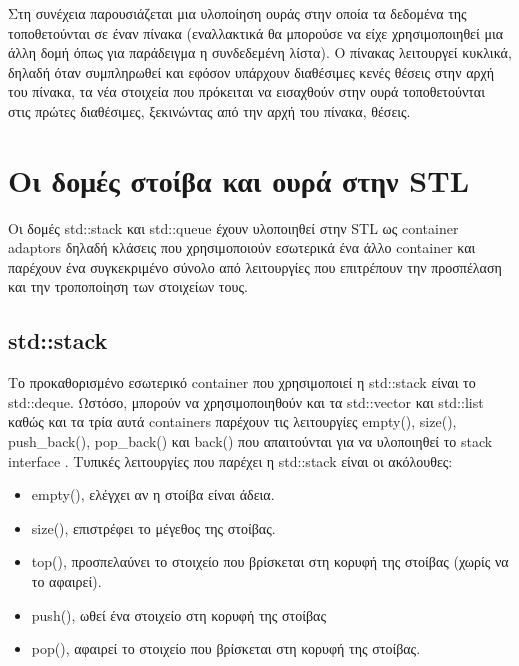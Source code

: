 Στη συνέχεια παρουσιάζεται μια υλοποίηση ουράς στην οποία τα δεδομένα της τοποθετούνται σε έναν πίνακα (εναλλακτικά θα μπορούσε να είχε χρησιμοποιηθεί μια άλλη δομή όπως για παράδειγμα η συνδεδεμένη λίστα). Ο πίνακας λειτουργεί κυκλικά, δηλαδή όταν συμπληρωθεί και εφόσον υπάρχουν διαθέσιμες κενές θέσεις στην αρχή του πίνακα, τα νέα στοιχεία που πρόκειται να εισαχθούν στην ουρά τοποθετούνται στις πρώτες διαθέσιμες, ξεκινώντας από την αρχή του πίνακα, θέσεις.





\section{Οι δομές στοίβα και ουρά στην STL}
Οι δομές std::stack και std::queue έχουν υλοποιηθεί στην STL ως container adaptors δηλαδή κλάσεις που χρησιμοποιούν εσωτερικά ένα άλλο container και παρέχουν ένα συγκεκριμένο σύνολο από λειτουργίες που επιτρέπουν την προσπέλαση και την τροποποίηση των στοιχείων τους. 

\subsection{std::stack}
Το προκαθορισμένο εσωτερικό container που χρησιμοποιεί η std::stack είναι το std::deque. Ωστόσο, μπορούν να χρησιμοποιηθούν και τα std::vector και std::list καθώς και τα τρία αυτά containers παρέχουν τις λειτουργίες empty(), size(), push\_back(), pop\_back() και back() που απαιτούνται για να υλοποιηθεί το stack interface \cite{scobey_stl_stack}. Τυπικές λειτουργίες που παρέχει η std::stack είναι οι ακόλουθες:
\begin{itemize}[noitemsep]
\item empty(), ελέγχει αν η στοίβα είναι άδεια.
\item size(), επιστρέφει το μέγεθος της στοίβας.
\item top(), προσπελαύνει το στοιχείο που βρίσκεται στη κορυφή της στοίβας (χωρίς να το αφαιρεί).
\item push(), ωθεί ένα στοιχείο στη κορυφή της στοίβας
\item pop(), αφαιρεί το στοιχείο που βρίσκεται στη κορυφή της στοίβας.
\end{itemize}

